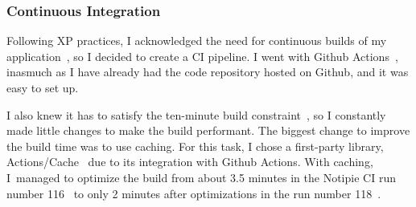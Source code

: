 \subsubsection{Continuous Integration}\label{sec:continuous-integration}

Following \ac{XP} practices,
I acknowledged the need for
continuous builds of my application~\cite{beck_extreme_2004},
so I decided to create a \ac{CI} pipeline.
I went with Github Actions~\cite{github_inc_github_2022-1},
inasmuch as I have already had
the code repository hosted on Github,
and it was easy to set up.

I also knew it has to satisfy
the ten-minute build constraint~\cite{beck_extreme_2004},
so I constantly made little changes
to make the build performant.
The biggest change to improve
the build time was to use caching.
For this task, I chose a first-party library,
Actions/Cache~\cite{sharma_actionscache_2022}
due to its integration with Github Actions.
With caching,
I~managed to optimize the build
from about 3.5 minutes
in the Notipie \ac{CI} run number 116~
to only 2 minutes after optimizations
in the run number 118~.

